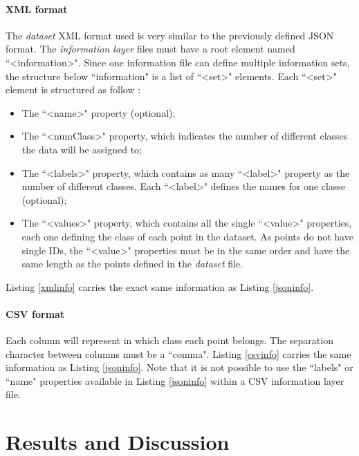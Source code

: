 \documentclass[10pt]{bmc_article}
\newenvironment{bmcformat}{\baselineskip20pt\sloppy\setboolean{publ}{false}}{\baselineskip20pt\sloppy}
\begin{document}
\begin{bmcformat}
\paragraph{XML format}
The {\it{dataset}} XML format used is very similar to the previously defined JSON format. The {\it{information layer}} files must have a root element named  ``<information>". Since one information file can define multiple information sets, the structure below ``information" is a list of ``<set>" elements. Each ``<set>" element is structured as follow :
\begin{itemize}
\item{The ``<name>" property (optional);}
\item{The ``<numClass>" property, which indicates the number of different classes the data will be assigned to;}
\item{The ``<labels>" property, which contains as many ``<label>" property as the number of different classes. Each ``<label>" defines the names for one classe (optional);}
\item{The ``<values>" property, which contains all the single ``<value>" properties, each one defining the class of each point in the dataset. As points do not have single IDs, the ``<value>" properties must be in the same order and have the same length as the points defined in the {\it{dataset}} file.}
\end{itemize}
Listing \ref{xmlinfo} carries the exact same information as Listing \ref{jsoninfo}.


\paragraph{CSV format}
Each column will represent in which class each point belongs. The separation character between columns must be a ``comma". Listing \ref{csvinfo} carries the same information as Listing \ref{jsoninfo}. Note that it is not possible to use the ``labels" or ``name" properties available in Listing \ref{jsoninfo} within a CSV information layer file. 




\section{Results and Discussion}



\end{bmcformat}
\end{document}
